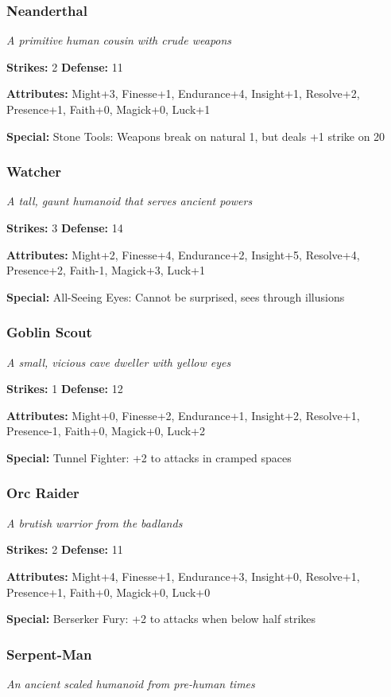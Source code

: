 \documentclass[10pt,twoside]{article}
\begin{document}
\subsubsection{Neanderthal}
\textit{A primitive human cousin with crude weapons}

\textbf{Strikes:} 2 \quad \textbf{Defense:} 11

\textbf{Attributes:} Might+3, Finesse+1, Endurance+4, Insight+1, Resolve+2, Presence+1, Faith+0, Magick+0, Luck+1

\textbf{Special:} Stone Tools: Weapons break on natural 1, but deals +1 strike on 20

\subsubsection{Watcher}
\textit{A tall, gaunt humanoid that serves ancient powers}

\textbf{Strikes:} 3 \quad \textbf{Defense:} 14

\textbf{Attributes:} Might+2, Finesse+4, Endurance+2, Insight+5, Resolve+4, Presence+2, Faith-1, Magick+3, Luck+1

\textbf{Special:} All-Seeing Eyes: Cannot be surprised, sees through illusions

\subsubsection{Goblin Scout}
\textit{A small, vicious cave dweller with yellow eyes}

\textbf{Strikes:} 1 \quad \textbf{Defense:} 12

\textbf{Attributes:} Might+0, Finesse+2, Endurance+1, Insight+2, Resolve+1, Presence-1, Faith+0, Magick+0, Luck+2

\textbf{Special:} Tunnel Fighter: +2 to attacks in cramped spaces

\subsubsection{Orc Raider}
\textit{A brutish warrior from the badlands}

\textbf{Strikes:} 2 \quad \textbf{Defense:} 11

\textbf{Attributes:} Might+4, Finesse+1, Endurance+3, Insight+0, Resolve+1, Presence+1, Faith+0, Magick+0, Luck+0

\textbf{Special:} Berserker Fury: +2 to attacks when below half strikes

\subsubsection{Serpent-Man}
\textit{An ancient scaled humanoid from pre-human times}
\end{document}
